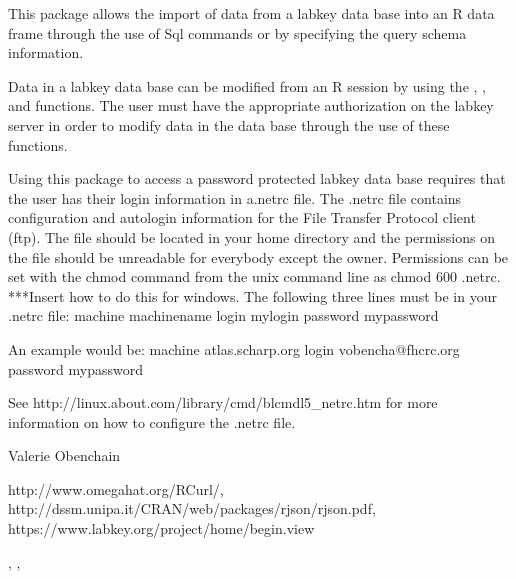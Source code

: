 \documentclass{article}
\begin{document}
\begin{Description}\relax
This package allows the import of data from a labkey data base
into an R data frame through the use of Sql
commands or by specifying the query schema information.

Data in a labkey data base can be modified from an R session
by using the , , and  functions.
The user must have the appropriate authorization on the labkey
server in order to modify data in the data base through the use of
these functions.
\end{Description}
\begin{Details}\relax
{}
Using this package to access a password protected labkey data base requires that the user
has their login information in a.netrc file. The .netrc file
contains configuration and autologin information for the File Transfer Protocol client (ftp).
The file should be located in your home directory and the permissions on the file should be unreadable for 
everybody except the owner. Permissions can be set with the chmod command from the unix command line
as chmod 600 .netrc.  ***Insert how to do this for windows.
The following three lines must be in your .netrc file:
machine machinename
login mylogin
password mypassword

An example would be:
machine atlas.scharp.org
login vobencha@fhcrc.org
password mypassword

See http://linux.about.com/library/cmd/blcmdl5_netrc.htm for more information on how to configure
the .netrc file.
\end{Details}
\begin{Author}\relax
Valerie Obenchain
\end{Author}
\begin{References}\relax
http://www.omegahat.org/RCurl/,
http://dssm.unipa.it/CRAN/web/packages/rjson/rjson.pdf,
https://www.labkey.org/project/home/begin.view
\end{References}
\begin{SeeAlso}\relax
{}, , 
\end{SeeAlso}
\end{document}
